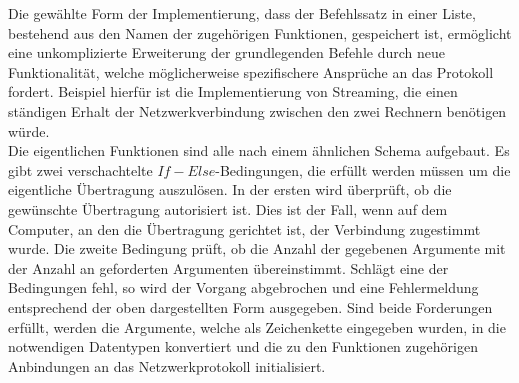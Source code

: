 Die gewählte Form der Implementierung, dass der Befehlssatz in einer Liste, bestehend aus den Namen der zugehörigen Funktionen, gespeichert ist, ermöglicht eine unkomplizierte Erweiterung der grundlegenden Befehle durch neue Funktionalität, welche möglicherweise spezifischere Ansprüche an das Protokoll fordert. 
Beispiel hierfür ist die Implementierung von Streaming, die einen ständigen Erhalt der Netzwerkverbindung zwischen den zwei Rechnern benötigen würde. \\
Die eigentlichen Funktionen sind alle nach einem ähnlichen Schema aufgebaut. 
Es gibt zwei verschachtelte $If-Else$-Bedingungen, die erfüllt werden müssen um die eigentliche Übertragung auszulösen. 
In der ersten wird überprüft, ob die gewünschte Übertragung autorisiert ist. 
Dies ist der Fall, wenn auf dem Computer, an den die Übertragung gerichtet ist, der Verbindung zugestimmt wurde. 
Die zweite Bedingung prüft, ob die Anzahl der gegebenen Argumente mit der Anzahl an geforderten Argumenten übereinstimmt. 
Schlägt eine der Bedingungen fehl, so wird der Vorgang abgebrochen und eine Fehlermeldung entsprechend der oben dargestellten Form ausgegeben. 
Sind beide Forderungen erfüllt, werden die Argumente, welche als Zeichenkette eingegeben wurden, in die notwendigen Datentypen konvertiert und die zu den Funktionen zugehörigen Anbindungen an das Netzwerkprotokoll initialisiert.  \\\hfill\\



%
